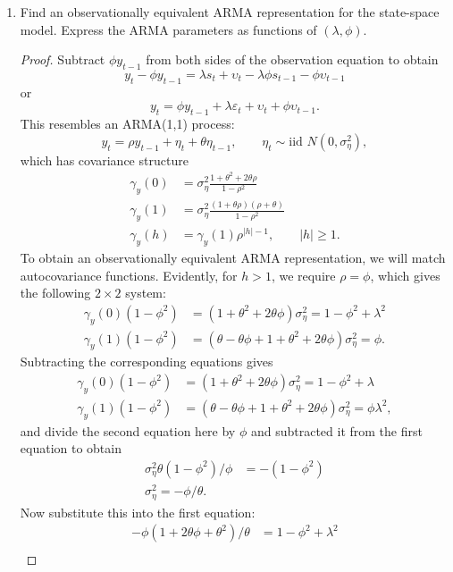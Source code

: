 \documentclass[oneside,reqno]{amsart}
\newcommand{\eps}{\varepsilon}
\newcommand{\ups}{\upsilon}
\theoremstyle{definition}
\begin{document}
\begin{enumerate}
\item
Find an observationally equivalent ARMA representation for the state-space model. Express the ARMA parameters as functions of $(\lambda, \phi)$. 

\begin{proof}
Subtract $\phi y_{t-1}$ from both sides of the observation equation to obtain 
\[
	y_t - \phi y_{t-1} = \lambda s_t + \ups_t - \lambda \phi s_{t-1} - \phi \ups_{t-1} 
\]	
or 
\[
	y_t = \phi y_{t-1} + \lambda \eps_t + \ups_t + \phi \ups_{t-1}.
\]
This resembles an ARMA(1,1) process:
\[
	y_t = \rho y_{t-1} + \eta_t + \theta \eta_{t-1}, 
	\qquad \eta_t  \sim \text{iid } N(0, \sigma_\eta^2),
\]
which has covariance structure 
\begin{align*}
	\gamma_y(0) &= \sigma_\eta^2 \frac{1+\theta^2 + 2 \theta \rho}{1-\rho^2}  \\
	\gamma_y(1) &= \sigma_\eta^2\frac{(1+  \theta \rho)(\rho +\theta)}{1-\rho^2}\\
	\gamma_y(h) &= \gamma_y(1)  \rho^{|h|-1}, \qquad |h| \geq 1.
\end{align*}
To obtain an observationally equivalent ARMA representation, we will match autocovariance functions. Evidently, for $h>1$, we require $\rho = \phi$, which gives the following $2 \times 2$ system:
\begin{align*}
	\gamma_y(0)(1-\phi^2) &= (1+\theta^2 + 2 \theta \phi) \sigma_\eta^2  = 1-\phi^2 + \lambda^2 \\
	\gamma_y(1)(1-\phi^2) &= (\theta - \theta \phi + 1 + \theta^2 + 2 \theta \phi) \sigma_\eta^2  = \phi.
\end{align*}
Subtracting the corresponding equations gives 
\begin{align*}
	\gamma_y(0)(1-\phi^2) &= (1+\theta^2 + 2 \theta \phi) \sigma_\eta^2  = 1-\phi^2+ \lambda \\
	\gamma_y(1)(1-\phi^2) &= (\theta - \theta \phi + 1 + \theta^2 + 2 \theta \phi) \sigma_\eta^2  = \phi \lambda^2,
\end{align*}
and divide the second equation here by $\phi$ and subtracted it from the first equation to obtain 
\begin{align*}
	\sigma_\eta^2\theta(1-\phi^2)/\phi &= - (1-\phi^2) \\
	\sigma_\eta^2 = -\phi/\theta.
\end{align*}
Now substitute this into the first equation:
\begin{align*}
	-\phi(1 + 2 \theta\phi + \theta^2 )/ \theta &= 1 - \phi^2 + \lambda^2 \\

\end{align*}
\end{proof}
\end{enumerate}
\end{document}
